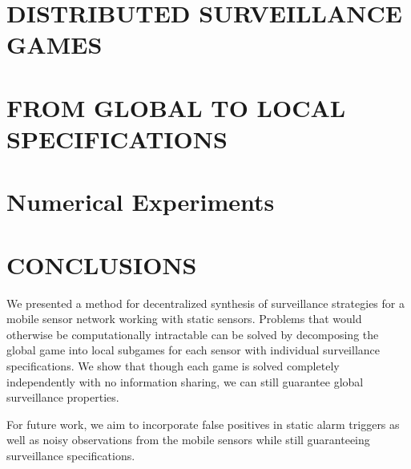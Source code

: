 \documentclass[letterpaper, 10 pt, conference]{ieeeconf}  %
\begin{document}



\section{DISTRIBUTED SURVEILLANCE GAMES}


\section{FROM GLOBAL TO LOCAL SPECIFICATIONS}

%
%

\section{Numerical Experiments}\label{sec:experiments}



\section{CONCLUSIONS}
We presented a method for decentralized synthesis of surveillance strategies for a mobile sensor network working with static sensors. Problems that would otherwise be computationally intractable can be solved by decomposing the global game into local subgames for each sensor with individual surveillance specifications. We show that though each game is solved completely independently with no information sharing, we can still guarantee global surveillance properties.

For future work, we aim to incorporate false positives in static alarm triggers as well as noisy observations from the mobile sensors while still guaranteeing surveillance specifications.








\end{document}
